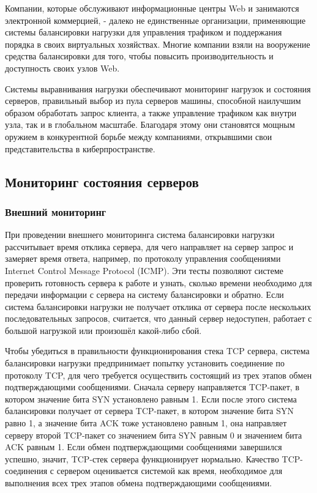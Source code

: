 Компании, которые обслуживают информационные центры Web и занимаются электронной коммерцией, - далеко не единственные организации, применяющие системы балансировки нагрузки для управления трафиком и поддержания порядка в своих виртуальных хозяйствах. Многие компании взяли на вооружение средства балансировки для того, чтобы повысить производительность и доступность своих узлов Web.

Системы выравнивания нагрузки обеспечивают мониторинг нагрузок и состояния серверов, правильный выбор из пула серверов машины, способной наилучшим образом обработать запрос клиента, а также управление трафиком как внутри узла, так и в глобальном масштабе. Благодаря этому они становятся мощным оружием в конкурентной борьбе между компаниями, открывшими свои представительства в киберпространстве.

\subsection{Мониторинг состояния серверов}

\subsubsection{Внешний мониторинг}

При проведении внешнего мониторинга система балансировки нагрузки рассчитывает время отклика сервера, для чего направляет на сервер запрос и замеряет время ответа, например, по протоколу управления сообщениями Internet Control Message Protocol (ICMP).  Эти тесты позволяют системе проверить  готовность сервера к работе и узнать, сколько времени необходимо для передачи информации с сервера на систему балансировки и обратно. Если система балансировки нагрузки не получает отклика от сервера после нескольких последовательных запросов, считается, что данный сервер недоступен, работает с большой нагрузкой или произошёл какой-либо сбой.

Чтобы убедиться в правильности функционирования стека TCP сервера, система балансировки нагрузки предпринимает попытку установить соединение по протоколу TCP, для чего требуется осуществить состоящий из трех этапов обмен подтверждающими сообщениями. Сначала серверу направляется TCP-пакет, в котором значение бита SYN установлено равным 1. Если после этого система балансировки получает от сервера TCP-пакет, в котором значение бита SYN равно 1, а значение бита ACK тоже установлено равным 1, она направляет серверу второй TCP-пакет со значением бита SYN равным 0 и значением бита ACK равным 1. Если обмен подтверждающими сообщениями завершился успешно, значит, TCP-стек сервера функционирует нормально. Качество TCP-соединения с сервером оценивается системой как время, необходимое для выполнения всех трех этапов обмена подтверждающими сообщениями.


